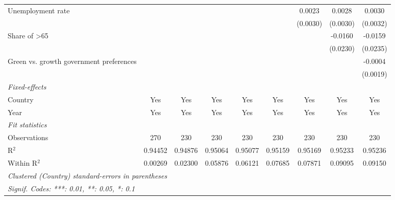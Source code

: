 \begin{table}[htbp]
\begin{tabular}{lcccccccc}
      Unemployment rate                       &          &          &                &                &                & 0.0023         & 0.0028         & 0.0030\\   
                                              &          &          &                &                &                & (0.0030)       & (0.0030)       & (0.0032)\\   
      Share of >65                            &          &          &                &                &                &                & -0.0160        & -0.0159\\   
                                              &          &          &                &                &                &                & (0.0230)       & (0.0235)\\   
      Green vs. growth government preferences &          &          &                &                &                &                &                & -0.0004\\   
                                              &          &          &                &                &                &                &                & (0.0019)\\   
      \midrule
      \emph{Fixed-effects}\\
      Country                                 & Yes      & Yes      & Yes            & Yes            & Yes            & Yes            & Yes            & Yes\\  
      Year                                    & Yes      & Yes      & Yes            & Yes            & Yes            & Yes            & Yes            & Yes\\  
      \midrule
      \emph{Fit statistics}\\
      Observations                            & 270      & 230      & 230            & 230            & 230            & 230            & 230            & 230\\  
      R$^2$                                   & 0.94452  & 0.94876  & 0.95064        & 0.95077        & 0.95159        & 0.95169        & 0.95233        & 0.95236\\  
      Within R$^2$                            & 0.00269  & 0.02300  & 0.05876        & 0.06121        & 0.07685        & 0.07871        & 0.09095        & 0.09150\\  
      \midrule \midrule
      \multicolumn{9}{l}{\emph{Clustered (Country) standard-errors in parentheses}}\\
      \multicolumn{9}{l}{\emph{Signif. Codes: ***: 0.01, **: 0.05, *: 0.1}}\\
   \end{tabular}
\end{table}


